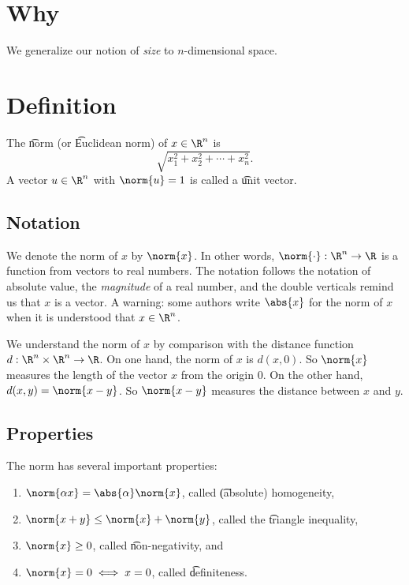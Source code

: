 
\section*{Why}

We generalize our notion of \textit{size} to $n$-dimensional space.

\section*{Definition}

The \t{norm} (or \t{Euclidean norm}) of $x \in \R ^n$ is
\[
\sqrt{x_1^2 + x_2^2 + \cdots + x_n^2}.
\]
A vector $u \in \R ^n$ with $\norm{u} = 1$ is called a \t{unit vector}.

\subsection*{Notation}

We denote the norm of $x$ by $\norm{x}$.
In other words, $\norm{\cdot}: \R ^n \to \R $ is a function from vectors to real numbers.
The notation follows the notation of absolute value, the \textit{magnitude} of a real number, and the double verticals remind us that $x$ is a vector.
A warning: some authors write $\abs{x}$ for the norm of $x$ when it is understood that $x \in \R ^n$.

We understand the norm of $x$ by comparison with the distance function $d: \R ^n \times  \R ^n \to \R $.
On one hand, the norm of $x$ is $d(x, 0)$.
So $\norm{x}$ measures the length of the vector $x$ from the origin $0$.
On the other hand, $d(x, y) = \norm{x - y}$.
So $\norm{x - y}$ measures the distance between $x$ and $y$.

\subsection*{Properties}

The norm has several important properties:
    \begin{enumerate}
      \item $\norm{\alpha x} = \abs{\alpha}\norm{x}$, called \t{(absolute) homogeneity},
      \item $\norm{x + y} \leq \norm{x} + \norm{y}$, called the \t{triangle inequality},
      \item $\norm{x} \geq 0$, called \t{non-negativity}, and
      \item $\norm{x} = 0 \iff x = 0$, called \t{definiteness}.
    \end{enumerate}

\blankpage